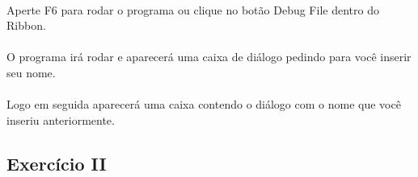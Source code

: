 \documentclass[letterpaper,10pt,brazil]{sphinxmanual}
\begin{document}
\begin{figure}[htbp]
\centering

\noindent{}
\end{figure}


\paragraph{}
\label{\detokenize{exercise_1:ix-execute-a-sequencia}}
Aperte F6 para rodar o programa ou clique no botão Debug File dentro do Ribbon.

\begin{figure}[htbp]
\centering

\noindent{}
\end{figure}


\paragraph{}
\label{\detokenize{exercise_1:x-programa-sendo-executado}}
O programa irá rodar e aparecerá uma caixa de diálogo pedindo para você inserir seu nome.
\begin{quote}

\begin{figure}[htbp]
\centering

\noindent{}
\end{figure}
\end{quote}


\paragraph{}
\label{\detokenize{exercise_1:xi-dialogo-final}}
Logo em seguida aparecerá uma caixa contendo o diálogo com o nome que você inseriu anteriormente.
\begin{quote}

\begin{figure}[htbp]
\centering

\noindent{}
\end{figure}
\end{quote}


\subsection{Exercício II}
\label{\detokenize{exercise_2:exercicio-ii}}\label{\detokenize{exercise_2::doc}}
\end{document}
